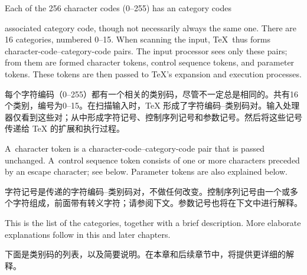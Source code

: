 Each of the 256 character codes (0--255) has an
\term category codes\par
associated category code, though not necessarily always the same one.
There are 16 categories, numbered 0--15. 
When scanning the input, \TeX\
thus forms character-code--category-code pairs.
The input processor sees only these pairs; from them are formed
character tokens, control sequence tokens, and parameter tokens.
These tokens are then passed to \TeX's expansion and execution
processes.

每个字符编码（0--255）都有一个相关的类别码，尽管不一定总是相同的。共有16个类别，编号为0--15。在扫描输入时，\TeX{} 形成了字符编码--类别码对。输入处理器仅看到这些对；从中形成字符记号、控制序列记号和参数记号。然后将这些记号传递给 \TeX{} 的扩展和执行过程。

A~character token is a character-code--category-code
pair that is passed unchanged.
A~control sequence token consists of one or more characters
preceded by an escape character; see below.
Parameter tokens are also explained below.

字符记号是传递的字符编码--类别码对，不做任何改变。控制序列记号由一个或多个字符组成，前面带有转义字符；请参阅下文。参数记号也将在下文中进行解释。

This is the list of the categories, together with a brief
description. More elaborate explanations follow in this and
later chapters.

下面是类别码的列表，以及简要说明。在本章和后续章节中，将提供更详细的解释。


